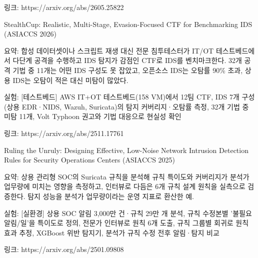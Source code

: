 \par\noindent \textbullet\enspace 링크: https:/\allowbreak{}/\allowbreak{}arxiv.org/\allowbreak{}abs/\allowbreak{}2605.25822



\par\noindent \textbullet\enspace StealthCup: Realistic, Multi-Stage, Evasion-Focused CTF for Benchmarking IDS (ASIACCS 2026)

\par\noindent \textbullet\enspace 요약: 합성 데이터셋이나 스크립트 재생 대신 전문 침투테스터가 IT/\allowbreak{}OT 테스트베드에서 다단계 공격을 수행하고 IDS 탐지가 감점인 CTF로 IDS를 벤치마크한다. 32개 공격 기법 중 11개는 어떤 IDS 구성도 못 잡았고, 오픈소스 IDS는 오탐률 90\% 초과, 상용 IDS는 오탐이 적은 대신 미탐이 많았다.


\par\noindent \textbullet\enspace 실험: [테스트베드] AWS IT+\allowbreak{}OT 테스트베드(158 VM)에서 12팀 CTF, IDS 7개 구성(상용 EDR·NIDS, Wazuh, Suricata)의 탐지 커버리지·오탐률 측정, 32개 기법 중 미탐 11개, Volt Typhoon 권고와 기법 대응으로 현실성 확인


\par\noindent \textbullet\enspace 링크: https:/\allowbreak{}/\allowbreak{}arxiv.org/\allowbreak{}abs/\allowbreak{}2511.17761



\par\noindent \textbullet\enspace Ruling the Unruly: Designing Effective, Low-Noise Network Intrusion Detection Rules for Security Operations Centers (ASIACCS 2025)

\par\noindent \textbullet\enspace 요약: 상용 관리형 SOC의 Suricata 규칙을 분석해 규칙 특이도와 커버리지가 분석가 업무량에 미치는 영향을 측정하고, 인터뷰로 다듬은 6개 규칙 설계 원칙을 실측으로 검증한다. 탐지 성능을 분석가 업무량이라는 운영 지표로 환산한 예.


\par\noindent \textbullet\enspace 실험: [실환경] 상용 SOC 알림 3,000만 건·규칙 29만 개 분석, 규칙 수정본별 '불필요 알림/\allowbreak{}일'을 특이도로 정의, 전문가 인터뷰로 원칙 6개 도출, 규칙 그룹별 회귀로 원칙 효과 추정, XGBoost 위반 탐지기, 분석가 규칙 수정 전후 알림·탐지 비교


\par\noindent \textbullet\enspace 링크: https:/\allowbreak{}/\allowbreak{}arxiv.org/\allowbreak{}abs/\allowbreak{}2501.09808



